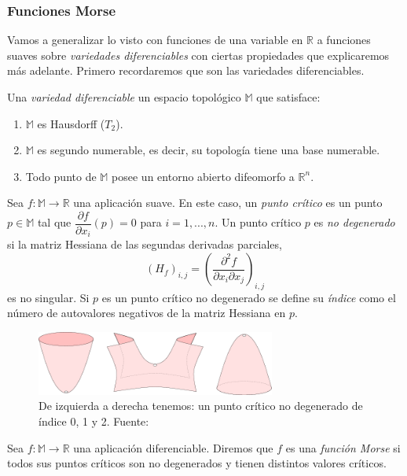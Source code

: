\subsubsection*{Funciones Morse} 
Vamos a generalizar lo visto con funciones de una variable en $\mathbb{R}$ a funciones suaves sobre \emph{variedades diferenciables} con ciertas propiedades que explicaremos más adelante. Primero recordaremos que son las variedades diferenciables.

\begin{definition}
Una \emph{variedad diferenciable} un espacio topológico $\mathbb{M}$ que satisface:
\begin{enumerate}
	\item $\mathbb{M}$ es Hausdorff ($T_2$).
	\item $\mathbb{M}$ es segundo numerable, es decir, su topología tiene una base numerable.
	\item Todo punto de $\mathbb{M}$ posee un entorno abierto difeomorfo a $\mathbb{R}^n$.
\end{enumerate}
\end{definition}

Sea $f: \mathbb{M} \to \mathbb{R}$ una aplicación suave. En este caso, un \emph{punto crítico} es un punto $p \in \mathbb{M}$ tal que $\dfrac{\partial f}{\partial x_i}(p)=0$ para $i = 1, ..., n$. Un punto crítico $p$ es \emph{no degenerado} si la matriz Hessiana de las segundas derivadas parciales,
\[
(H_f)_{i,j}=\left(\dfrac{\partial^2 f}{\partial x_i \partial x_j}\right)_{i,j}
\]
es no singular. Si $p$ es un punto crítico no degenerado se define su \emph{índice} como el número de autovalores negativos de la matriz Hessiana en $p$.

\begin{figure}[!ht]
\centering
\includegraphics[width=0.7\textwidth]{include/figuras/From-left-to-right-a-minimum-saddle-and-maximum-of-the-vertical-height-function.png} 
\caption{De izquierda a derecha tenemos: un punto crítico no degenerado de índice 0, 1 y 2. Fuente: \cite{articuloPersistenciaEH}}
\label{ref:morseCriticos}
\end{figure}

\begin{definition}
Sea $f: \mathbb{M} \to \mathbb{R}$ una aplicación diferenciable. Diremos que $f$ es una \emph{función Morse} si todos sus puntos críticos son no degenerados y tienen distintos valores críticos.
\end{definition}


